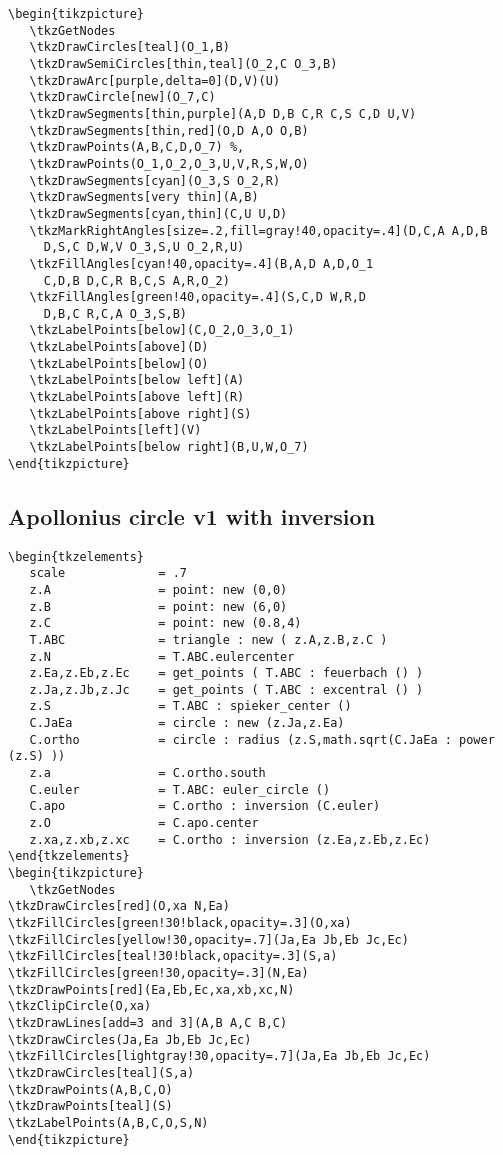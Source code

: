 \begin{Verbatim}
\begin{tikzpicture}
   \tkzGetNodes
   \tkzDrawCircles[teal](O_1,B)
   \tkzDrawSemiCircles[thin,teal](O_2,C O_3,B)
   \tkzDrawArc[purple,delta=0](D,V)(U)
   \tkzDrawCircle[new](O_7,C)
   \tkzDrawSegments[thin,purple](A,D D,B C,R C,S C,D U,V)
   \tkzDrawSegments[thin,red](O,D A,O O,B)
   \tkzDrawPoints(A,B,C,D,O_7) %,
   \tkzDrawPoints(O_1,O_2,O_3,U,V,R,S,W,O)
   \tkzDrawSegments[cyan](O_3,S O_2,R)
   \tkzDrawSegments[very thin](A,B)
   \tkzDrawSegments[cyan,thin](C,U U,D)
   \tkzMarkRightAngles[size=.2,fill=gray!40,opacity=.4](D,C,A A,D,B
     D,S,C D,W,V O_3,S,U O_2,R,U)
   \tkzFillAngles[cyan!40,opacity=.4](B,A,D A,D,O_1
     C,D,B D,C,R B,C,S A,R,O_2)
   \tkzFillAngles[green!40,opacity=.4](S,C,D W,R,D
     D,B,C R,C,A O_3,S,B)
   \tkzLabelPoints[below](C,O_2,O_3,O_1)
   \tkzLabelPoints[above](D)
   \tkzLabelPoints[below](O)
   \tkzLabelPoints[below left](A)
   \tkzLabelPoints[above left](R)
   \tkzLabelPoints[above right](S)
   \tkzLabelPoints[left](V)
   \tkzLabelPoints[below right](B,U,W,O_7)
\end{tikzpicture}
\end{Verbatim}

\subsection{Apollonius circle v1 with inversion} %
\label{sub:apollonius_circle_v1_with_inversion}
\begin{Verbatim}
\begin{tkzelements}
   scale             = .7
   z.A               = point: new (0,0)
   z.B               = point: new (6,0)
   z.C               = point: new (0.8,4)
   T.ABC             = triangle : new ( z.A,z.B,z.C )
   z.N               = T.ABC.eulercenter
   z.Ea,z.Eb,z.Ec    = get_points ( T.ABC : feuerbach () )
   z.Ja,z.Jb,z.Jc    = get_points ( T.ABC : excentral () )
   z.S               = T.ABC : spieker_center ()
   C.JaEa            = circle : new (z.Ja,z.Ea)
   C.ortho           = circle : radius (z.S,math.sqrt(C.JaEa : power (z.S) ))
   z.a               = C.ortho.south
   C.euler           = T.ABC: euler_circle ()
   C.apo             = C.ortho : inversion (C.euler)
   z.O               = C.apo.center
   z.xa,z.xb,z.xc    = C.ortho : inversion (z.Ea,z.Eb,z.Ec)
\end{tkzelements}
\begin{tikzpicture}
   \tkzGetNodes
\tkzDrawCircles[red](O,xa N,Ea)
\tkzFillCircles[green!30!black,opacity=.3](O,xa)
\tkzFillCircles[yellow!30,opacity=.7](Ja,Ea Jb,Eb Jc,Ec)
\tkzFillCircles[teal!30!black,opacity=.3](S,a)
\tkzFillCircles[green!30,opacity=.3](N,Ea)
\tkzDrawPoints[red](Ea,Eb,Ec,xa,xb,xc,N)
\tkzClipCircle(O,xa)
\tkzDrawLines[add=3 and 3](A,B A,C B,C)
\tkzDrawCircles(Ja,Ea Jb,Eb Jc,Ec)
\tkzFillCircles[lightgray!30,opacity=.7](Ja,Ea Jb,Eb Jc,Ec)
\tkzDrawCircles[teal](S,a)
\tkzDrawPoints(A,B,C,O)
\tkzDrawPoints[teal](S)
\tkzLabelPoints(A,B,C,O,S,N)
\end{tikzpicture}
\end{Verbatim}

